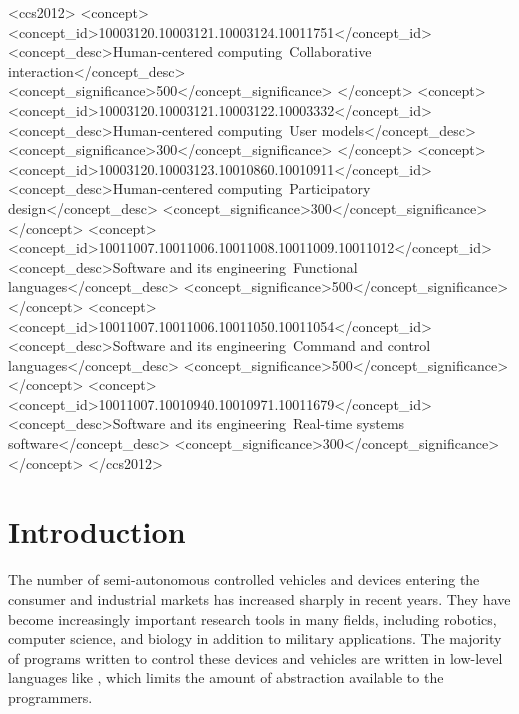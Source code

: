 \documentclass{sig-alternate-05-2015}
\begin{document}
%
%
\begin{CCSXML}
<ccs2012>
<concept>
<concept_id>10003120.10003121.10003124.10011751</concept_id>
<concept_desc>Human-centered computing~Collaborative interaction</concept_desc>
<concept_significance>500</concept_significance>
</concept>
<concept>
<concept_id>10003120.10003121.10003122.10003332</concept_id>
<concept_desc>Human-centered computing~User models</concept_desc>
<concept_significance>300</concept_significance>
</concept>
<concept>
<concept_id>10003120.10003123.10010860.10010911</concept_id>
<concept_desc>Human-centered computing~Participatory design</concept_desc>
<concept_significance>300</concept_significance>
</concept>
<concept>
<concept_id>10011007.10011006.10011008.10011009.10011012</concept_id>
<concept_desc>Software and its engineering~Functional languages</concept_desc>
<concept_significance>500</concept_significance>
</concept>
<concept>
<concept_id>10011007.10011006.10011050.10011054</concept_id>
<concept_desc>Software and its engineering~Command and control languages</concept_desc>
<concept_significance>500</concept_significance>
</concept>
<concept>
<concept_id>10011007.10010940.10010971.10011679</concept_id>
<concept_desc>Software and its engineering~Real-time systems software</concept_desc>
<concept_significance>300</concept_significance>
</concept>
</ccs2012>
\end{CCSXML}


\printccsdesc

\keywords{}

\section{Introduction}
\label{sec:intro}
The number of semi-autonomous controlled vehicles and devices entering the
consumer and industrial markets has increased sharply in recent years. They
have become increasingly important research tools in many fields, including
robotics, computer science, and biology in addition to military
applications. The majority of programs written to control these devices and
vehicles are written in low-level languages like , which limits the
amount of abstraction available to the programmers.
\end{document}
